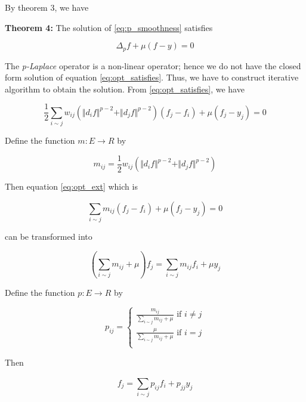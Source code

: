 By theorem 3, we have

\textbf{Theorem 4:} The solution of \ref{eq:p_smoothness} satisfies


\begin{equation}
\label{eq:opt_satisfies}
\Delta _{p}f+ \mu  \left( f-y \right) = 0
\end{equation}


The \textit{p-Laplace} operator is a non-linear operator; hence we do not have the closed form solution of equation \ref{eq:opt_satisfies}. Thus, we have to construct iterative algorithm to obtain the solution. From \ref{eq:opt_satisfies}, we have


\begin{equation}
\label{eq:opt_ext}
\frac{1}{2} \sum _{i \sim j}^{}w_{ij} \left(  \Vert d_{i}f \Vert ^{p-2}+ \Vert d_{j}f \Vert ^{p-2} \right)  \left( f_{j}-f_{i} \right) + \mu  \left( f_{j}-y_{j} \right) = 0
\end{equation}


Define the function  \( m:E \rightarrow R \) by 


\begin{equation}
m_{ij}=\frac{1}{2}w_{ij} \left(  \Vert d_{i}f \Vert ^{p-2}+ \Vert d_{j}f \Vert ^{p-2} \right)
\end{equation}


Then equation \ref{eq:opt_ext} which is 

$$\sum _{i \sim j}^{}m_{ij} \left( f_{j}-f_{i} \right) + \mu  \left( f_{j}-y_{j} \right) =0 $$

can be transformed into


\begin{equation}
\left(  \sum _{i \sim j}^{}m_{ij}+ \mu  \right) f_{j}= \sum _{i \sim j}^{}m_{ij}f_{i}+ \mu y_{j}
\end{equation}


Define the function  \( p:E \rightarrow R \)  by 


\begin{equation}
p_{ij} = \begin{cases}
  \frac{m_{ij}}{ \sum _{i \sim j}m_{ij}+ \mu } \text{ if } i \neq j \\
  \frac{ \mu }{ \sum _{i \sim j}m_{ij}+ \mu } \text{ if } i=j \\
\end{cases}
\end{equation}


Then 


\begin{equation}
f_{j}= \sum _{i \sim j}^{}p_{ij}f_{i}+p_{jj}y_{j}
\end{equation}


